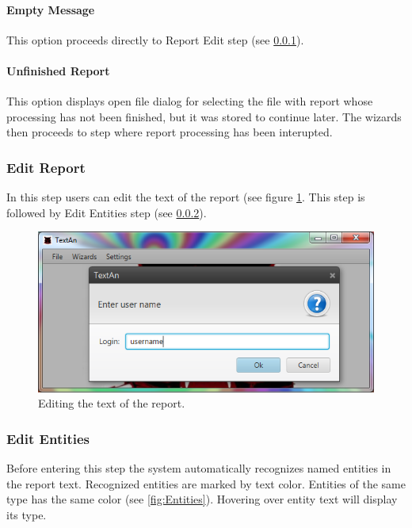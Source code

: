 \documentclass[12pt,a4paper]{report}
\begin{document}
\paragraph{Empty Message} This option proceeds directly to Report Edit step
(see \ref{sssec:ReportEdit}).

\paragraph{Unfinished Report} This option displays open file dialog for
selecting the file with report whose processing has not been finished, but it
was stored to continue later. The wizards then proceeds to step where report
processing has been interupted.

\subsubsection{Edit Report}
\label{sssec:ReportEdit}

In this step users can edit the text of the report (see figure
\ref{fig:ReportEdit}. This step is followed by Edit Entities step (see
\ref{sssec:EditEntities}).

\begin{figure}[!htb]
        \centering
        \includegraphics[width=\textwidth]{Images/reportedit}
        \caption{Editing the text of the report.}
        \label{fig:ReportEdit}
\end{figure}

\subsubsection{Edit Entities}
\label{sssec:EditEntities}

Before entering this step the system automatically recognizes named entities
in the report text. Recognized entities are marked by text color. Entities of
the same type has the same color (see \ref{fig:Entities}). Hovering over entity
text will display its type.
\end{document}
